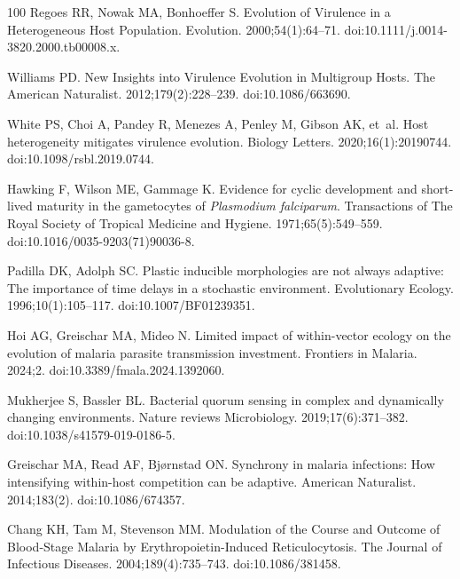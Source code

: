 \documentclass[10pt,letterpaper]{article}
\begin{document}
\begin{thebibliography}{100}
Regoes RR, Nowak MA, Bonhoeffer S.
\newblock Evolution of {Virulence} in a {Heterogeneous} {Host} {Population}.
\newblock Evolution. 2000;54(1):64--71.
\newblock doi:{10.1111/j.0014-3820.2000.tb00008.x}.

Williams PD.
\newblock New {Insights} into {Virulence} {Evolution} in {Multigroup} {Hosts}.
\newblock The American Naturalist. 2012;179(2):228--239.
\newblock doi:{10.1086/663690}.

White PS, Choi A, Pandey R, Menezes A, Penley M, Gibson AK, et~al.
\newblock Host heterogeneity mitigates virulence evolution.
\newblock Biology Letters. 2020;16(1):20190744.
\newblock doi:{10.1098/rsbl.2019.0744}.

Hawking F, Wilson ME, Gammage K.
\newblock Evidence for cyclic development and short-lived maturity in the gametocytes of \textit{{Plasmodium} falciparum}.
\newblock Transactions of The Royal Society of Tropical Medicine and Hygiene. 1971;65(5):549--559.
\newblock doi:{10.1016/0035-9203(71)90036-8}.

Padilla DK, Adolph SC.
\newblock Plastic inducible morphologies are not always adaptive: {The} importance of time delays in a stochastic environment.
\newblock Evolutionary Ecology. 1996;10(1):105--117.
\newblock doi:{10.1007/BF01239351}.

Hoi AG, Greischar MA, Mideo N.
\newblock Limited impact of within-vector ecology on the evolution of malaria parasite transmission investment.
\newblock Frontiers in Malaria. 2024;2.
\newblock doi:{10.3389/fmala.2024.1392060}.

Mukherjee S, Bassler BL.
\newblock Bacterial quorum sensing in complex and dynamically changing environments.
\newblock Nature reviews Microbiology. 2019;17(6):371--382.
\newblock doi:{10.1038/s41579-019-0186-5}.

Greischar MA, Read AF, Bjørnstad ON.
\newblock Synchrony in malaria infections: {How} intensifying within-host competition can be adaptive.
\newblock American Naturalist. 2014;183(2).
\newblock doi:{10.1086/674357}.

Chang KH, Tam M, Stevenson MM.
\newblock Modulation of the {Course} and {Outcome} of {Blood}-{Stage} {Malaria} by {Erythropoietin}-{Induced} {Reticulocytosis}.
\newblock The Journal of Infectious Diseases. 2004;189(4):735--743.
\newblock doi:{10.1086/381458}.


\end{thebibliography}
\end{document}
